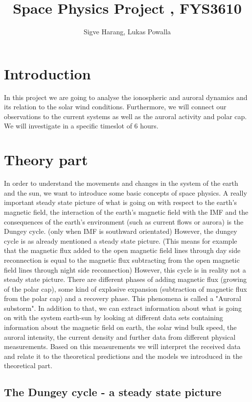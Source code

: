 \documentclass[10pt,a4paper]{article}
\author{Sigve Harang, Lukas Powalla}
\title{Space Physics Project , FYS3610}
\begin{document}
\maketitle
\newpage
\tableofcontents
\newpage
\section*{Introduction}
In this project we are going to analyse the ionospheric and auroral dynamics and its relation to the solar wind conditions. Furthermore, we will connect our observations to the current systems as well as the auroral activity and polar cap.  We will investigate in a specific timeslot of 6 hours.  
\section{Theory part}
In order to understand the movements and changes in the system of the earth and the sun, we want to introduce some basic concepts of space physics. 
A really important steady state picture of what is going on with respect to the earth's magnetic field, the interaction of the earth's magnetic field with the IMF and the consequences of the earth's environment (such as current flows or aurora) is the Dungey cycle. (only when IMF is southward orientated)
However, the dungey cycle is as already mentioned a steady state picture. (This means for example that the magnetic flux added to the open magnetic field lines through day side reconnection is equal to the magnetic flux subtracting from the open magnetic field lines through night side reconnection)
However, this cycle is in reality not a steady state picture. There are different phases of adding magnetic flux (growing of the polar cap), some kind of explosive expansion (subtraction of magnetic flux from the polar cap) and a recovery phase. This phenomena is called a "Auroral substorm". In addition to that, we can extract information about what is going on with the system earth-sun by looking at different data sets containing information about the magnetic field on earth, the solar wind bulk speed, the auroral intensity, the current density and further data from different physical measurements. 
Based on this measurements we will interpret the received data and relate it to the theoretical predictions and the models we introduced in the theoretical part.

\subsection{The Dungey cycle - a steady state picture \label{Dungey cycle}}
\end{document}
